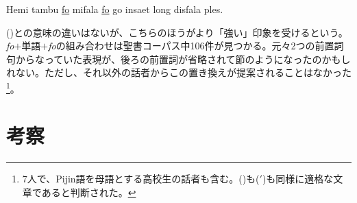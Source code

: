 \begin{exe}
 Hemi tambu \underline{fo} mifala \underline{fo} go insaet long disfala ples.
\end{exe}

()との意味の違いはないが、こちらのほうがより「強い」印象を受けるという。\textit{fo}$+$単語$+$\textit{fo}の組み合わせは聖書コーパス中106件が見つかる。元々2つの前置詞句からなっていた表現が、後ろの前置詞が省略されて節のようになったのかもしれない。ただし、それ以外の話者からこの置き換えが提案されることはなかった\footnote{7人で、Pijin語を母語とする高校生の話者も含む。()も($'$)も同様に適格な文章であると判断された。}。
\section{考察}
